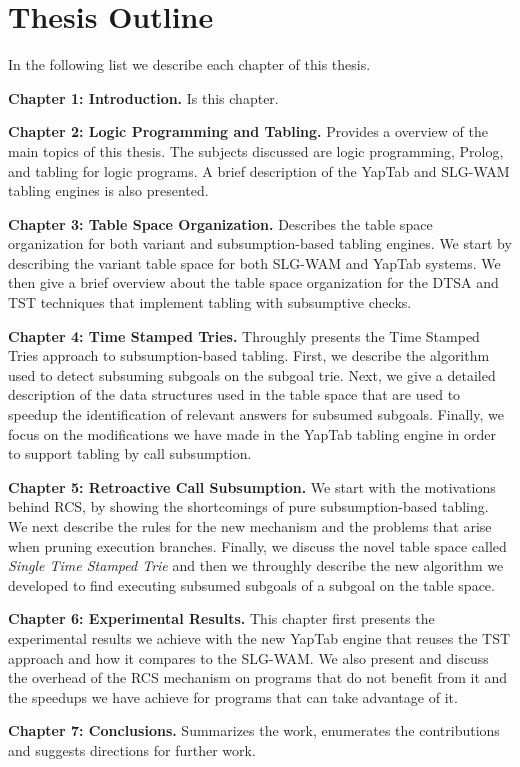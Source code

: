 \section{Thesis Outline}

In the following list we describe each chapter of this thesis.

\textbf{Chapter 1: Introduction.} Is this chapter.

\textbf{Chapter 2: Logic Programming and Tabling.} Provides a overview of the main topics of this thesis.
The subjects discussed are logic programming, Prolog, and tabling for logic programs. A brief description
of the YapTab and SLG-WAM tabling engines is also presented.

\textbf{Chapter 3: Table Space Organization.} Describes the table space organization for both variant and
subsumption-based tabling engines. We start by describing the variant table space for both SLG-WAM and
YapTab systems. We then give a brief overview about the table space organization for the DTSA and TST
techniques that implement tabling with subsumptive checks.

\textbf{Chapter 4: Time Stamped Tries.} Throughly presents the Time Stamped Tries approach to subsumption-based
tabling. First, we describe the algorithm used to detect subsuming subgoals on the subgoal trie. Next,
we give a detailed description of the data structures used in the table space that are used to speedup
the identification of relevant answers for subsumed subgoals. Finally, we focus on the modifications we have
made in the YapTab tabling engine in order to support tabling by call subsumption.

\textbf{Chapter 5: Retroactive Call Subsumption.} We start with the motivations behind RCS, by showing the shortcomings
of pure subsumption-based tabling. We next describe the rules for the new mechanism and the problems that arise
when pruning execution branches. Finally, we discuss the novel table space called \emph{Single Time Stamped Trie}
and then we throughly describe the new algorithm we developed to find executing subsumed subgoals of a subgoal on the
table space.

\textbf{Chapter 6: Experimental Results.} This chapter first presents the experimental results we achieve with
the new YapTab engine that reuses the TST approach and how it compares to the SLG-WAM. We also present and
discuss the overhead of the RCS mechanism on programs that do not benefit from it and the speedups we have
achieve for programs that can take advantage of it.

\textbf{Chapter 7: Conclusions.} Summarizes the work, enumerates the contributions and suggests directions for
further work.
